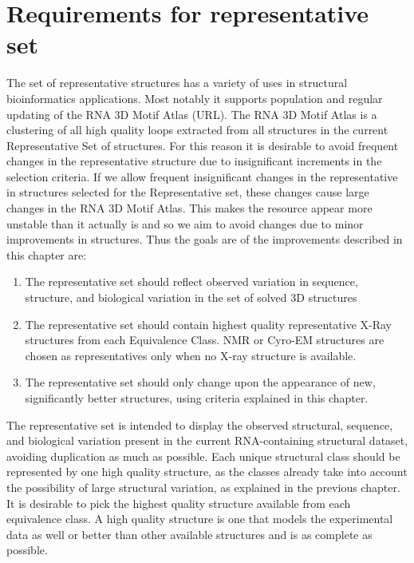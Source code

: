 \section{Requirements for representative set}

The set of representative structures has a variety of uses in structural
bioinformatics applications. Most notably it supports population and regular
updating of the RNA 3D Motif Atlas (URL). The RNA 3D Motif Atlas is a clustering
of all high quality loops extracted from all structures in the current
Representative Set of structures. For this reason it is desirable to avoid
frequent changes in the representative structure due to insignificant increments
in the selection criteria. If we allow frequent insignificant changes in the
representative in structures selected for the Representative set, these changes
cause large changes in the RNA 3D Motif Atlas. This makes the resource appear
more unstable than it actually is and so we aim to avoid changes due to minor
improvements in structures. Thus the goals are of the improvements described in
this chapter are:
\begin{enumerate}
  \item The representative set should reflect observed variation in sequence,
    structure, and biological variation in the set of solved 3D structures

  \item The representative set should contain highest quality representative
    X-Ray structures from each Equivalence Class. NMR or Cyro-EM structures are
    chosen as representatives only when no X-ray structure is available.

  \item The representative set should only change upon the appearance of new,
    significantly better structures, using criteria explained in this chapter.
\end{enumerate}

The representative set is intended to display the observed structural, sequence,
and biological variation present in the current RNA-containing structural
dataset, avoiding duplication as much as possible. Each unique structural class
should be represented by one high quality structure, as the classes already take
into account the possibility of large structural variation, as explained in the
previous chapter. It is desirable to pick the highest quality structure
available from each equivalence class. A high quality structure is one that
models the experimental data as well or better than other available structures
and is as complete as possible.

